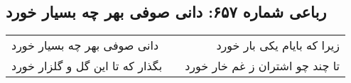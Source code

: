 \begin{center}
\section*{رباعی شماره ۶۵۷: دانی صوفی بهر چه بسیار خورد}
\label{sec:0657}
\begin{longtable}{l p{0.5cm} r}
دانی صوفی بهر چه بسیار خورد
&&
زیرا که بایام یکی بار خورد
\\
بگذار که تا این گل و گلزار خورد
&&
تا چند چو اشتران ز غم خار خورد
\\
\end{longtable}
\end{center}
